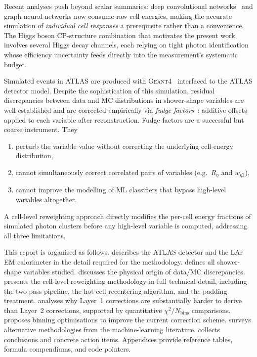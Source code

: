 \documentclass[11pt,a4paper]{article}
\newcommand{\Reta}{R_{\eta}}
\newcommand{\weta}{w_{\eta 2}}
\newcommand{\chisq}{\chi^2/N_\mathrm{bins}}
\begin{document}
Recent analyses push beyond scalar summaries: deep convolutional
networks~\cite{ATLAS:CaloCellML} and graph neural networks now
consume raw cell energies, making the accurate simulation of
\emph{individual cell responses} a prerequisite rather than a
convenience.  The Higgs boson CP-structure combination that motivates
the present work involves several Higgs decay channels, each relying
on tight photon identification whose efficiency uncertainty feeds
directly into the measurement's systematic budget.

Simulated events in ATLAS are produced with \textsc{Geant4}~\cite{Geant4:2003}
interfaced to the ATLAS detector model.  Despite the sophistication of
this simulation, residual discrepancies between data and MC
distributions in shower-shape variables are well established and are
corrected empirically via \emph{fudge factors}~\cite{ATLAS:fudgePub}:
additive offsets applied to each variable after reconstruction.  Fudge
factors are a successful but coarse instrument.  They
\begin{enumerate}[label=(\roman*)]
  \item perturb the variable value without correcting the underlying
        cell-energy distribution,
  \item cannot simultaneously correct correlated pairs of variables
        (e.g.\ $\Reta$ and $\weta$),
  \item cannot improve the modelling of ML classifiers that bypass
        high-level variables altogether.
\end{enumerate}
A cell-level reweighting approach directly modifies the per-cell
energy fractions of simulated photon clusters before any high-level
variable is computed, addressing all three limitations.

This report is organised as follows.
 describes the ATLAS detector and the LAr EM
calorimeter in the detail required for the methodology.
 defines all shower-shape variables studied.
 discusses the physical origin of data/MC
discrepancies.
 presents the cell-level reweighting methodology in
full technical detail, including the two-pass pipeline, the
hot-cell recentering algorithm, and the padding treatment.
 analyses why Layer~1 corrections are substantially
harder to derive than Layer~2 corrections, supported by quantitative
$\chisq$ comparisons.
 proposes binning optimisations to improve the
current correction scheme.
 surveys alternative methodologies from the
machine-learning literature.
 collects conclusions and concrete action items.
Appendices provide reference tables, formula compendiums, and
code pointers.
\end{document}
